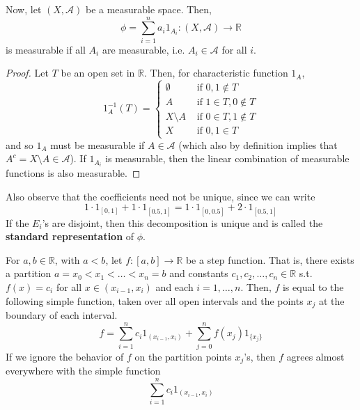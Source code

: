 \documentclass{article}
\begin{document}
      \begin{lemma}
        Now, let $(X, \mathcal{A})$ be a measurable space. Then, 
        \begin{equation}
          \phi = \sum_{i=1}^n a_i 1_{A_i} : (X, \mathcal{A}) \longrightarrow \mathbb{R}
        \end{equation}
        is measurable if all $A_i$ are measurable, i.e. $A_i \in \mathcal{A}$ for all $i$. 
      \end{lemma}
      \begin{proof}
        Let $T$ be an open set in $\mathbb{R}$. Then, for characteristic function $1_A$, 
        \begin{equation}
          1_A^{-1} (T) = \begin{cases} 
          \emptyset & \text{ if } 0, 1 \not\in T \\
          A & \text{ if } 1 \in T, 0 \not\in T \\
          X \setminus A & \text{ if } 0 \in T, 1 \not\in T \\
          X & \text{ if } 0, 1 \in T
          \end{cases}
        \end{equation}
        and so $1_A$ must be measurable if $A \in \mathcal{A}$ (which also by definition implies that $A^c = X \setminus A \in \mathcal{A}$). If $1_{A_i}$ is measurable, then the linear combination of measurable functions is also measurable. 
      \end{proof}

      Also observe that the coefficients need not be unique, since we can write 
      \begin{equation}
        1 \cdot 1_{[0, 1]} + 1 \cdot 1_{[0.5, 1]} = 1 \cdot 1_{[0, 0.5]} + 2 \cdot 1_{[0.5, 1]}
      \end{equation}
      If the $E_i$'s are disjoint, then this decomposition is unique and is called the \textbf{standard representation} of $\phi$. 

      \begin{example}
        For $a, b \in \mathbb{R}$, with $a < b$, let $f: [a, b] \longrightarrow \mathbb{R}$ be a step function. That is, there exists a partition $a = x_0 < x_1 < \ldots < x_n = b$ and constants $c_1, c_2, \ldots, c_n \in \mathbb{R}$ s.t. $f(x) = c_i$ for all $x \in (x_{i-1}, x_i)$ and each $i = 1, \ldots, n$. Then, $f$ is equal to the following simple function, taken over all open intervals and the points $x_j$ at the boundary of each interval. 
        \begin{equation}
          f = \sum_{i=1}^n c_i 1_{(x_{i-1}, x_i)} + \sum_{j=0}^n f(x_j) 1_{\{x_j\}}
        \end{equation}
        If we ignore the behavior of $f$ on the partition points $x_j$'s, then $f$ agrees almost everywhere with the simple function 
        \begin{equation}
          \sum_{i=1}^n c_i 1_{(x_{i-1}, x_i)}
        \end{equation}
      \end{example}
\end{document}
